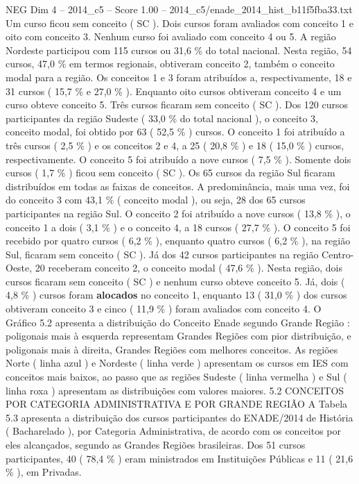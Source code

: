 \begin{textsample}{NEG Dim 4 – 2014\_c5 – Score 1.00 – 2014\_c5/enade\_2014\_hist\_b11f5fba33.txt}
Um curso ficou sem conceito ( SC ).
Dois cursos foram avaliados com conceito 1 e oito com conceito 3.
Nenhum curso foi avaliado com conceito 4 ou 5.
A região Nordeste participou com 115 cursos ou 31,6 \% do total nacional.
Nesta região, 54 cursos, 47,0 \% em termos regionais, obtiveram conceito 2, também o conceito modal para a região.
Os conceitos 1 e 3 foram atribuídos a, respectivamente, 18 e 31 cursos ( 15,7 \% e 27,0 \% ).
Enquanto oito cursos obtiveram conceito 4 e um curso obteve conceito 5.
Três cursos ficaram sem conceito ( SC ).
Dos 120 cursos participantes da região Sudeste ( 33,0 \% do total nacional ), o conceito 3, conceito modal, foi obtido por 63 ( 52,5 \% ) cursos.
O conceito 1 foi atribuído a três cursos ( 2,5 \% ) e os conceitos 2 e 4, a 25 ( 20,8 \% ) e 18 ( 15,0 \% ) cursos, respectivamente.
O conceito 5 foi atribuído a nove cursos ( 7,5 \% ).
Somente dois cursos ( 1,7 \% ) ficou sem conceito ( SC ).
Os 65 cursos da região Sul ficaram distribuídos em todas as faixas de conceitos.
A predominância, mais uma vez, foi do conceito 3 com 43,1 \% ( conceito modal ), ou seja, 28 dos 65 cursos participantes na região Sul.
O conceito 2 foi atribuído a nove cursos ( 13,8 \% ), o conceito 1 a dois ( 3,1 \% ) e o conceito 4, a 18 cursos ( 27,7 \% ).
O conceito 5 foi recebido por quatro cursos ( 6,2 \% ), enquanto quatro cursos ( 6,2 \% ), na região Sul, ficaram sem conceito ( SC ).
Já dos 42 cursos participantes na região Centro-Oeste, 20 receberam conceito 2, o conceito modal ( 47,6 \% ).
Nesta região, dois cursos ficaram sem conceito ( SC ) e nenhum curso obteve conceito 5.
Já, dois ( 4,8 \% ) cursos foram \textbf{alocados} no conceito 1, enquanto 13 ( 31,0 \% ) dos cursos obtiveram conceito 3 e cinco ( 11,9 \% ) foram avaliados com conceito 4.
O Gráfico 5.2 apresenta a distribuição do Conceito Enade segundo Grande Região : poligonais mais à esquerda representam Grandes Regiões com pior distribuição, e poligonais mais à direita, Grandes Regiões com melhores conceitos.
As regiões Norte ( linha azul ) e Nordeste ( linha verde ) apresentam os cursos em IES com conceitos mais baixos, ao passo que as regiões Sudeste ( linha vermelha ) e Sul ( linha roxa ) apresentam as distribuições com valores maiores. 5.2 CONCEITOS POR CATEGORIA ADMINISTRATIVA E POR GRANDE REGIÃO A Tabela 5.3 apresenta a distribuição dos cursos participantes do ENADE/2014 de História ( Bacharelado ), por Categoria Administrativa, de acordo com os conceitos por eles alcançados, segundo as Grandes Regiões brasileiras.
Dos 51 cursos participantes, 40 ( 78,4 \% ) eram ministrados em Instituições Públicas e 11 ( 21,6 \% ), em Privadas.

\end{textsample}
